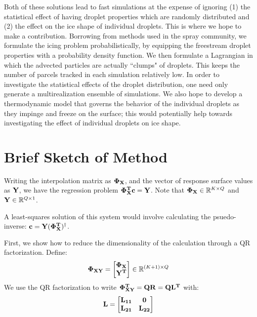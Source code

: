 \documentclass{article}
\begin{document}
Both of these solutions lead to fast simulations at the expense of ignoring (1) the statistical effect of 
having droplet properties which are randomly distributed and (2) the effect on the ice shape of individual 
droplets. This is where we hope to make a contribution. Borrowing from methods used in the spray 
community, we formulate the icing problem probabilistically, by equipping the freestream droplet 
properties with a probability density function. We then formulate a Lagrangian in which the advected 
particles are actually ``clumps" of droplets. This keeps the number of parcels tracked in each simulation 
relatively low. In order to investigate the statistical effects of the droplet distribution, one need only generate 
a multirealization ensemble of simulations. We also hope to develop a thermodynamic model that governs the 
behavior of the individual droplets as they impinge and freeze on the surface; this would potentially help 
towards investigating the effect of individual droplets on ice shape.


\section{Brief Sketch of Method}
Writing the interpolation matrix as $\bf \Phi_{X}$, and the vector of response surface values 
as $\bf Y$, we have the regression problem $\bf \Phi_{X}^T c = Y$. Note that ${\bf \Phi_X} \in \mathbb{R}^{K \times Q}$ 
and ${\bf Y} \in \mathbb{R}^{Q \times 1}$.

A least-squares solution of this system would involve calculating the psuedo-inverse: $\bf c = Y (\Phi_{X}^T)^{\dagger}$. 

First, we show how to reduce the dimensionality of the calculation through a QR factorization. Define:
\begin{equation}
{\bf \Phi_{XY}} = 
\begin{bmatrix}
\bf \Phi_X \\
\bf Y^T
\end{bmatrix}
\in \mathbb{R}^{(K+1) \times Q}
\end{equation}
We use the QR factorization to write $\bf \Phi_{XY}^T = QR = QL^T$ with: 
\begin{equation}
\bf L = 
\begin{bmatrix}
\bf L_{11} & \bf 0 \\
\bf L_{21} & \bf L_{22}
\end{bmatrix}
\end{equation}
\end{document}

